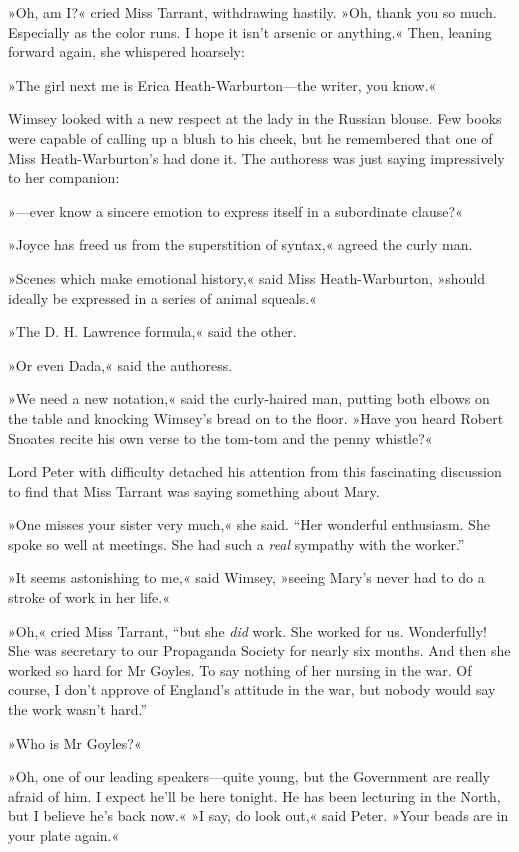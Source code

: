 »Oh, am I?« cried Miss Tarrant, withdrawing hastily. »Oh, thank you so much. Especially as the color runs. I hope it isn't arsenic or anything.« Then, leaning forward again, she whispered hoarsely:

»The girl next me is Erica Heath-Warburton\allowbreak---\allowbreak the writer, you know.«

Wimsey looked with a new respect at the lady in the Russian blouse.  Few books were capable of calling up a blush to his cheek, but he remembered that one of Miss Heath-Warburton's had done it. The authoress was just saying impressively to her companion:

»---ever know a sincere emotion to express itself in a subordinate clause?«

»Joyce has freed us from the superstition of syntax,« agreed the curly man.

»Scenes which make emotional history,« said Miss Heath-Warburton, »should ideally be expressed in a series of animal squeals.«

»The D. H. Lawrence formula,« said the other.

»Or even Dada,« said the authoress.

»We need a new notation,« said the curly-haired man, putting both elbows on the table and knocking Wimsey's bread on to the floor. »Have you heard Robert Snoates recite his own verse to the tom-tom and the penny whistle?«

Lord Peter with difficulty detached his attention from this fascinating discussion to find that Miss Tarrant was saying something about Mary.

»One misses your sister very much,« she said. \enquote{Her wonderful enthusiasm. She spoke so well at meetings. She had such a \textit{real} sympathy with the worker.}

»It seems astonishing to me,« said Wimsey, »seeing Mary's never had to do a stroke of work in her life.«

»Oh,« cried Miss Tarrant, \enquote{but she \textit{did} work. She worked for us.  Wonderfully! She was secretary to our Propaganda Society for nearly six months. And then she worked so hard for Mr Goyles. To say nothing of her nursing in the war. Of course, I don't approve of England's attitude in the war, but nobody would say the work wasn't hard.}

»Who is Mr Goyles?«

»Oh, one of our leading speakers\allowbreak---\allowbreak quite young, but the Government are really afraid of him. I expect he'll be here tonight. He has been lecturing in the North, but I believe he's back now.«
»I say, do look out,« said Peter. »Your beads are in your plate again.«

